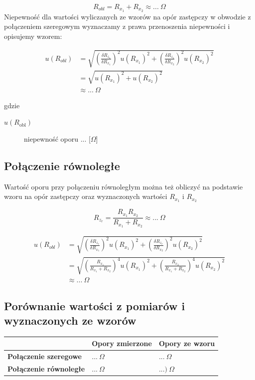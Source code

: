 \documentclass[a4paper,11pt]{article}
\begin{document}
$$
R_{obl} = R_{x_1} + R_{x_2} \approx ... ~\Omega
$$
\indent Niepewność dla wartości wyliczanych ze wzorów na opór zastępczy w obwodzie z połączeniem szeregowym wyznaczamy z prawa przenoszenia niepewności i opisujemy wzorem:
\begin{center}
\begin{align*}
u(R_{obl}) &= \sqrt{\left( \frac{\delta R_{z_{s}} }{\delta R_{x_1}}  \right)^2 u(R_{x_1})^2  +\left( \frac{\delta R_{z_{s}} }{\delta R_{x_2}}  \right)^2  u(R_{x_2})^2  } \\
& = \sqrt{u(R_{x_1})^2 + u(R_{x_2})^2} \\
&\approx ... ~\Omega
\end{align*}
\end{center}
gdzie 
\begin{description}
\item [$u(R_{\text{obl}})$] niepewność oporu ... [$\Omega$]
\end{description}

\subsection{Połączenie równoległe}
\indent Wartość oporu przy połączeniu równoległym można też obliczyć na podstawie wzoru na opór zastępczy oraz wyznaczonych wartości $R_{x_1}$ i  $R_{x_2}$

$$ 
R_{z_r} = \frac{ R_{x_1} R_{x_2}}{ R_{x_1} + R_{x_2}} \approx ...~\Omega
$$
\begin{center}
\begin{align*}
u(R_{obl}) &= \sqrt{\left( \frac{\delta R_{z_r} }{\delta R_{x_1}}  \right)^2 u(R_{x_1})^2  +\left( \frac{\delta R_{z_r} }{\delta R_{x_2}}  \right)^2  u(R_{x_2})^2  }\\ 
& =  \sqrt{\left(  \frac{R_{x_1}}{R_{x_1} + R_{x_2}}\right)^4  u(R_{x_1})^2 + \left(\frac{R_{x_2}}{R_{x_1} + R_{x_2}}\right)^4  u(R_{x_2})^2}\\ 
&\approx  ...~\Omega
\end{align*}
\end{center}


\subsection{Porównanie wartości z pomiarów i wyznaczonych ze wzorów}
\begin{tabularx}{\textwidth}{XXX}
\hline
 & \textbf{Opory zmierzone}  & \textbf{Opory ze wzoru} \\ 
\hline \textbf{Połączenie szeregowe} & $... ~\Omega$ & $... ~\Omega$ \\ 
\hline \textbf{Połączenie równoległe} & $...~\Omega$& $...) ~\Omega$\\ 
\hline 
\end{tabularx} 
\end{document}
